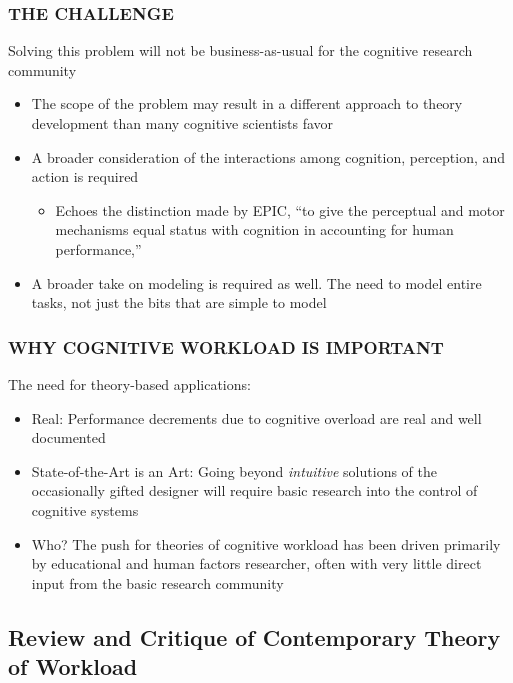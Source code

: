 \documentclass{beamer}
\begin{document}
\begin{frame}
	\frametitle{THE CHALLENGE}
Solving this problem will not be business-as-usual for the cognitive research community
	\begin{itemize}
			\item The scope of the problem may result in a different approach to theory development than many cognitive scientists favor
			\item A broader consideration of the interactions among cognition, perception, and action is required
			\begin{itemize}
				\item Echoes the distinction made by EPIC, ``to give the perceptual and motor mechanisms equal status with cognition in accounting for human performance,'' 
			\end{itemize}
			\pause
			\item A broader take on modeling is required as well. The need to model entire tasks, not just the bits that are simple to model \parencite{erik08pr.article,newell73chptr}
		\end{itemize}

\end{frame}

 \begin{frame}
	\frametitle{WHY COGNITIVE WORKLOAD IS IMPORTANT}
	The need for theory-based applications:
	\begin{itemize}
		\item Real: Performance decrements due to cognitive overload are real and well documented
		\item State-of-the-Art is an Art: Going beyond \emph{intuitive} solutions of the occasionally gifted designer will require basic research into the control of cognitive systems
		\item Who? The push for theories of cognitive workload has been driven primarily by educational and human factors researcher, often with very little direct input from the basic research community
	\end{itemize}
\end{frame}

\subsection{Review and Critique of Contemporary Theory of Workload}
\end{document}
